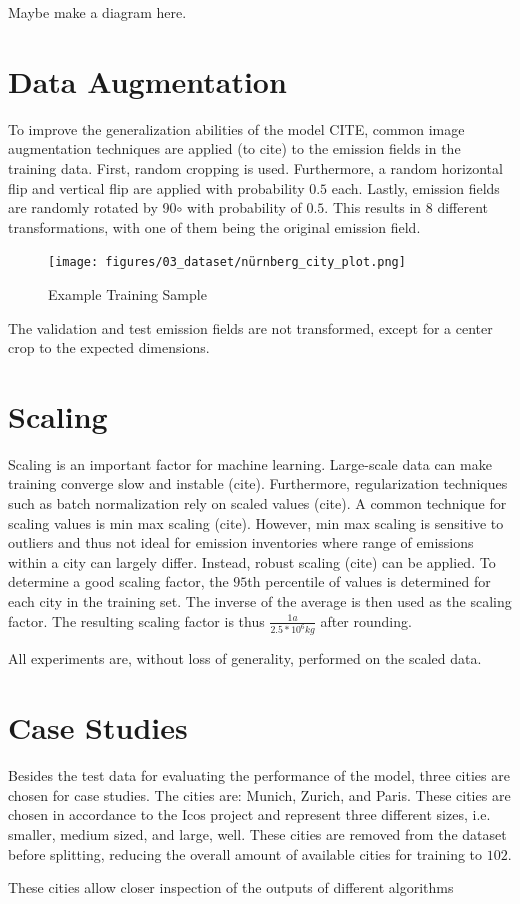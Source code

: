 Maybe make a diagram here.

\section{Data Augmentation}
To improve the generalization abilities of the model CITE, common image augmentation techniques are applied (to cite) to the emission fields in the training data.
First, random cropping is used.
Furthermore, a random horizontal flip and vertical flip are applied with probability $0.5$ each.
Lastly, emission fields are randomly rotated by 90$\circ$ with probability of $0.5$.
This results in $8$ different transformations, with one of them being the original emission field.
\begin{figure}[h!]
    \centering
    \texttt{[image: figures/03\_dataset/nürnberg\_city\_plot.png]}
    \caption{Example Training Sample}
\end{figure}

The validation and test emission fields are not transformed, except for a center crop to the expected dimensions.

\section{Scaling}
Scaling is an important factor for machine learning.
Large-scale data can make training converge slow and instable (cite).
Furthermore, regularization techniques such as batch normalization \parencite{BatchNorm} rely on scaled values (cite).
A common technique for scaling values is min max scaling (cite).
However, min max scaling is sensitive to outliers and thus not ideal for emission inventories where range of emissions within a city can largely differ.
Instead, robust scaling (cite) can be applied.
To determine a good scaling factor, the $95$th percentile of values is determined for each city in the training set.
The inverse of the average is then used as the scaling factor.
The resulting scaling factor is thus $\frac{1 a}{2.5 * 10^6 kg}$ after rounding.

All experiments are, without loss of generality, performed on the scaled data.

\section{Case Studies}
Besides the test data for evaluating the performance of the model, three cities are chosen for case studies.
The cities are: Munich, Zurich, and Paris.
These cities are chosen in accordance to the Icos project \parencite{Icos} and represent three different sizes, i.e. smaller, medium sized, and large, well.
These cities are removed from the dataset before splitting, reducing the overall amount of available cities for training to $102$.

These cities allow closer inspection of the outputs of different algorithms
